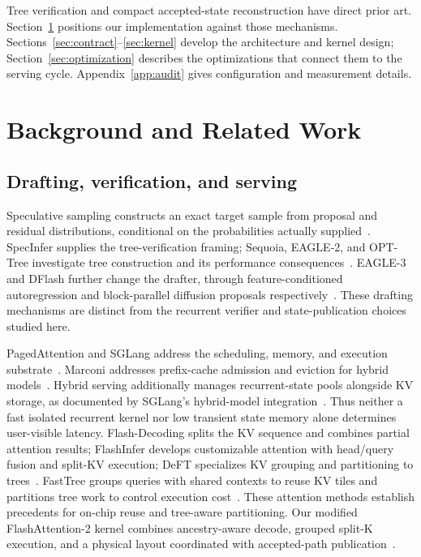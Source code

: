 \documentclass[conference]{IEEEtran}
\begin{document}
Tree verification and compact accepted-state reconstruction have direct prior art. Section~\ref{sec:related} positions our implementation against those mechanisms. Sections~\ref{sec:contract}--\ref{sec:kernel} develop the architecture and kernel design; Section~\ref{sec:optimization} describes the optimizations that connect them to the serving cycle. Appendix~\ref{app:audit} gives configuration and measurement details.

\section{Background and Related Work}
\label{sec:related}
\subsection{Drafting, verification, and serving}
Speculative sampling constructs an exact target sample from proposal and residual distributions, conditional on the probabilities actually supplied~\cite{leviathan2023fast,chen2023sampling}. SpecInfer supplies the tree-verification framing; Sequoia, EAGLE-2, and OPT-Tree investigate tree construction and its performance consequences~\cite{miao2023specinfer,chen2024sequoia,li2024eagle,wang2024opt}. EAGLE-3 and DFlash further change the drafter, through feature-conditioned autoregression and block-parallel diffusion proposals respectively~\cite{li2025eagle3,chen2026dflash}. These drafting mechanisms are distinct from the recurrent verifier and state-publication choices studied here.

PagedAttention and SGLang address the scheduling, memory, and execution substrate~\cite{kwon2023efficient,zheng2024sglang}. Marconi addresses prefix-cache admission and eviction for hybrid models~\cite{pan2024marconi}. Hybrid serving additionally manages recurrent-state pools alongside KV storage, as documented by SGLang's hybrid-model integration~\cite{pytorch2025sglang,sglang2026qwen}. Thus neither a fast isolated recurrent kernel nor low transient state memory alone determines user-visible latency. Flash-Decoding splits the KV sequence and combines partial attention results; FlashInfer develops customizable attention with head/query fusion and split-KV execution; DeFT specializes KV grouping and partitioning to trees~\cite{dao2023flashdecoding,ye2025flashinfer,yao2024deft}. FastTree groups queries with shared contexts to reuse KV tiles and partitions tree work to control execution cost~\cite{pan2025fasttree}. These attention methods establish precedents for on-chip reuse and tree-aware partitioning. Our modified FlashAttention-2 kernel combines ancestry-aware decode, grouped split-K execution, and a physical layout coordinated with accepted-path publication~\cite{dao2023flashattention}.
\end{document}
